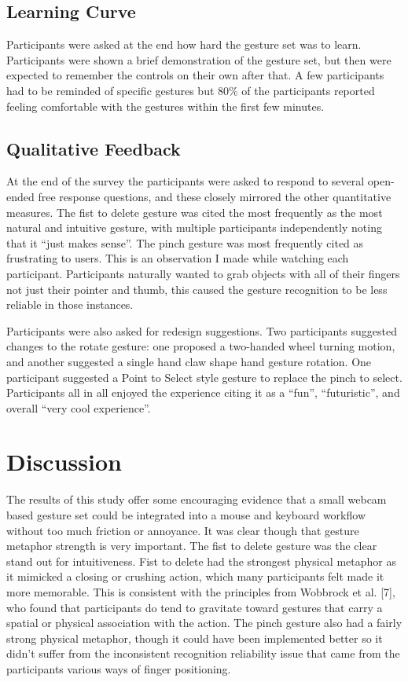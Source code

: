 \documentclass[manuscript]{acmart}
\begin{document}
\subsection{Learning Curve}

Participants were asked at the end how hard the gesture set was to learn. Participants were shown a brief demonstration of the gesture set, but then were expected to remember the controls on their own after that. A few participants had to be reminded of specific gestures but 80\% of the participants reported feeling comfortable with the gestures within the first few minutes.

\subsection{Qualitative Feedback}

At the end of the survey the participants were asked to respond to several open-ended free response questions, and these closely mirrored the other quantitative measures. The fist to delete gesture was cited the most frequently as the most natural and intuitive gesture, with multiple participants independently noting that it “just makes sense”. The pinch gesture was most frequently cited as frustrating to users. This is an observation I made while watching each participant. Participants naturally wanted to grab objects with all of their fingers not just their pointer and thumb, this caused the gesture recognition to be less reliable in those instances.

Participants were also asked for redesign suggestions. Two participants suggested changes to the rotate gesture: one proposed a two-handed wheel turning motion, and another suggested a single hand claw shape hand gesture rotation. One participant suggested a Point to Select style gesture to replace the pinch to select. Participants all in all enjoyed the experience citing it as a “fun”, “futuristic”, and overall “very cool experience”.

\section{Discussion}

The results of this study offer some encouraging evidence that a small webcam based gesture set could be integrated into a mouse and keyboard workflow without too much friction or annoyance. It was clear though that gesture metaphor strength is very important. The fist to delete gesture was the clear stand out for intuitiveness. Fist to delete had the strongest physical metaphor as it mimicked a closing or crushing action, which many participants felt made it more memorable. This is consistent with the principles from Wobbrock et al. [7], who found that participants do tend to gravitate toward gestures that carry a spatial or physical association with the action. The pinch gesture also had a fairly strong physical metaphor, though it could have been implemented better so it didn’t suffer from the inconsistent recognition reliability issue that came from the participants various ways of finger positioning.
\end{document}
